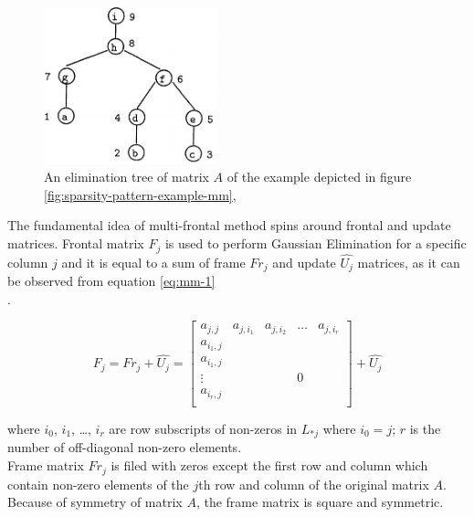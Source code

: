 \figpointer{\ref{fig:elimination-tree-mm}}

\begin{figure}[htpb]
  \centering
  \includegraphics[width=0.45\textwidth]{figures/chapter-2/elimination-tree-mm.png}
\caption{An elimination tree of matrix $A$ of the example depicted in figure \ref{fig:sparsity-pattern-example-mm},
 \cite{mult-frontal-original:2}}
\label{fig:elimination-tree-mm}
\end{figure}


The fundamental idea of multi-frontal method spins around frontal and update matrices. Frontal matrix $F_{j}$ is used to perform Gaussian Elimination for a specific column $j$ and it is equal to a sum of  frame $Fr_{j}$ and update $\hat{U_{j}}$ matrices, as it can be observed from equation \ref{eq:mm-1}\\.

\begin{equation} \label{eq:mm-1}
	F_{j} = Fr_{j} + \hat{U_{j}} = \begin{bmatrix}a_{j,j} & a_{j,i_1} & a_{j,i_2} & \dots & a_{j,i_r} \\
a_{i_1,j} \\
a_{i_1,j} \\
\vdots & & & 0\\
a_{i_r,j} \\
\end{bmatrix} + \hat{U_{j}}
\end{equation}

where $i_{0}$, $i_{1}$, \dots , $i_{r}$ are row subscripts of non-zeros in $L_{*j}$ where $i_{0} = j$; $r$ is the number of off-diagonal non-zero elements.\\

Frame matrix $Fr_{j}$ is filed with zeros except the first row and column which contain non-zero elements of the $j$th row and column of the original matrix $A$. Because of symmetry of matrix $A$, the frame matrix is square and symmetric.\\

